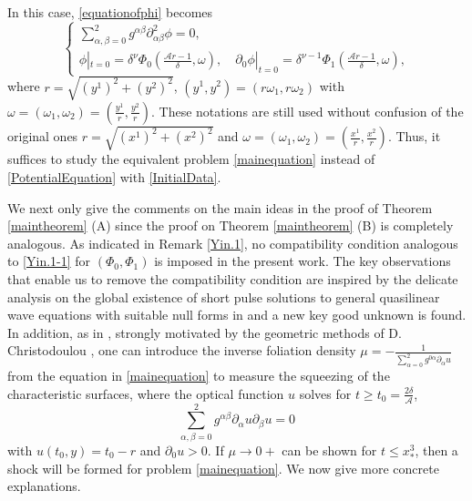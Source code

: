 \documentclass[11pt,twoside]{article}
\def\al{\alpha}
\def\be{\beta}
\def\f{\frac}
\def\p{\partial}
\def\dps{\displaystyle}
\begin{document}
In this case, \eqref{equationofphi} becomes
\begin{equation}\label{mainequation}
\begin{cases}
\displaystyle\sum_{\alpha,\beta=0}^2 g^{\alpha\beta} \partial_{\alpha\beta}^2 \phi = 0,\\[6pt]
\phi|_{t=0}=\delta^{\nu}\Phi_0(\frac{\mathcal{A}r - 1}{\delta}, \omega), \quad
\partial_{0}\phi|_{t=0}=\delta^{\nu - 1}\Phi_1(\frac{\mathcal{A}r - 1}{\delta}, \omega),
\end{cases}
\end{equation}
where $r=\sqrt{(y^1)^2 + (y^2)^2}$, $(y^1,y^2)=(r\omega_1, r\omega_2)$ with $\omega=(\omega_1, \omega_2)=\dps(\f{y^1}{r}, \f{y^2}{r})$.
These notations are still used without confusion of the original ones $r=\sqrt{(x^1)^2+(x^2)^2}$ and $\omega=(\omega_1, \omega_2)=\dps(\f{x^1}{r}, \f{x^2}{r})$. Thus, it suffices to study the equivalent problem \eqref{mainequation}
instead of \eqref{PotentialEquation} with \eqref{InitialData}.



We next only give the comments on the main ideas in the proof of Theorem \ref{maintheorem} (A) since the
proof on  Theorem \ref{maintheorem} (B) is completely analogous.
As indicated in Remark \ref{Yin.1}, no compatibility condition  analogous to \eqref{Yin.1-1} for
$(\Phi_0,\Phi_1)$ is imposed in the present work.
The key observations that enable us to remove the compatibility condition are inspired by the  delicate analysis on the global
existence of short pulse solutions to general quasilinear wave equations with suitable null forms in \cite{DLY,Ding2}
and a new key good unknown is found.
In addition, as in \cite{M-Y, L-Y},
strongly motivated by the geometric methods of D. Christodoulou \cite{Ch1},
one can introduce the inverse foliation density $\mu=-\dps\f{1}{\sum_{\al=0}^2g^{0\al}\p_{\al}u}$ from the equation
in \eqref{mainequation} to measure the squeezing of the characteristic surfaces, where the  optical function $u$ solves
for $t\ge t_0=\frac{2\delta}{\mathcal{A}}$,
\begin{equation}\label{YHCC-60}
\displaystyle\sum_{\alpha,\beta=0}^2 g^{\al\be}\p_{\al}u\p_{\be}u=0
\end{equation}
with $u(t_0,y)=t_0-r$ and $\p_0u>0$. If $\mu\to 0+$ can be shown for $t\le x^3_*$,
then a shock will be formed for problem \eqref{mainequation}.
We now give more concrete explanations.
\end{document}
